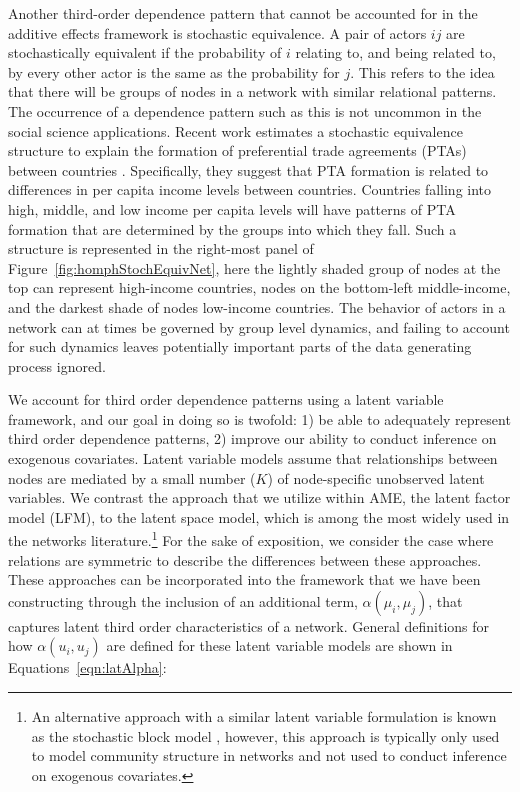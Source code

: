 \documentclass[12pt,pdflatex]{elsarticle}
\begin{document}
Another third-order dependence pattern that cannot be accounted for in the additive effects framework is stochastic equivalence. A pair of actors $ij$ are stochastically equivalent if the probability of $i$ relating to, and being related to, by every other actor is the same as the probability for $j$. This refers to the idea that there will be groups of nodes in a network with similar relational patterns. The occurrence of a dependence pattern such as this is not uncommon in the social science applications. Recent work estimates a stochastic equivalence structure to explain the formation of preferential trade agreements (PTAs) between countries \cite{manger:etal:2012}. Specifically, they suggest that PTA formation is related to differences in per capita income levels between countries. Countries falling into high, middle, and low income per capita levels will have patterns of PTA formation that are determined by the groups into which they fall. Such a structure is represented in the right-most panel of Figure~\ref{fig:homphStochEquivNet}, here the lightly shaded group of nodes at the top can represent high-income countries, nodes on the bottom-left middle-income, and the darkest shade of nodes low-income countries. The behavior of actors in a network can at times be governed by group level dynamics, and failing to account for such dynamics leaves potentially important parts of the data generating process ignored.

We account for third order dependence patterns using a latent variable framework, and our goal in doing so is twofold: 1) be able to adequately represent third order dependence patterns, 2) improve our ability to conduct inference on exogenous covariates. Latent variable models assume that relationships between nodes are mediated by a small number ($K$) of node-specific unobserved latent variables. We contrast the approach that we utilize within AME, the latent factor model (LFM), to the latent space model, which is among the most widely used in the networks literature.\footnote{An alternative approach with a similar latent variable formulation is known as the stochastic block model \citep{nowicki:snijders:2001}, however, this approach is typically only used to model community structure in networks and not used to conduct inference on exogenous covariates.} For the sake of exposition, we consider the case where relations are symmetric to describe the differences between these approaches. These approaches can be incorporated into the framework that we have been constructing through the inclusion of an additional term, $\alpha(\mu_{i}, \mu_{j})$, that captures latent third order characteristics of a network. General definitions for how $\alpha(u_{i}, u_{j})$ are defined for these latent variable models are shown in Equations~\ref{eqn:latAlpha}:
\end{document}
